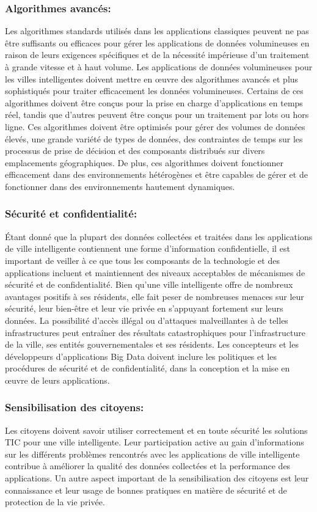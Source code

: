 \documentclass[french, a4paper, 12pt]{report}
\begin{document}
\subsubsection{Algorithmes avancés:}
Les algorithmes standards utilisés dans les applications classiques peuvent ne pas être suffisants ou efficaces pour gérer les applications de données volumineuses en raison de leurs exigences spécifiques et de la nécessité impérieuse d'un traitement à grande vitesse et à haut volume. Les applications de données volumineuses pour les villes intelligentes doivent mettre en œuvre des algorithmes avancés et plus sophistiqués pour traiter efficacement les données volumineuses. Certains de ces algorithmes doivent être conçus pour la prise en charge d'applications en temps réel, tandis que d'autres peuvent être conçus pour un traitement par lots ou hors ligne. Ces algorithmes doivent être optimisés pour gérer des volumes de données élevés, une grande variété de types de données, des contraintes de temps sur les processus de prise de décision et des composants distribués sur divers emplacements géographiques. De plus, ces algorithmes doivent fonctionner efficacement dans des environnements hétérogènes et être capables de gérer et de fonctionner dans des environnements hautement dynamiques.\\
\subsubsection{Sécurité et confidentialité:}
Étant donné que la plupart des données collectées et traitées dans les applications de ville intelligente contiennent une forme d’information confidentielle, il est important de veiller à ce que tous les composants de la technologie et des applications incluent et maintiennent des niveaux acceptables de mécanismes de sécurité et de confidentialité. Bien qu'une ville intelligente offre de nombreux avantages positifs à ses résidents, elle fait peser de nombreuses menaces sur leur sécurité, leur bien-être et leur vie privée en s'appuyant fortement sur leurs données. La possibilité d'accès illégal ou d'attaques malveillantes à de telles infrastructures peut entraîner des résultats catastrophiques pour l'infrastructure de la ville, ses entités gouvernementales et ses résidents. Les concepteurs et les développeurs d’applications Big Data doivent inclure les politiques et les procédures de sécurité et de confidentialité, dans la conception et la mise en œuvre de leurs applications. \\
\subsubsection{Sensibilisation des citoyens:}
Les citoyens doivent savoir utiliser correctement et en toute sécurité les solutions TIC pour une ville intelligente. Leur participation active au gain d'informations sur les différents problèmes rencontrés avec les applications de ville intelligente contribue à améliorer la qualité des données collectées et la performance des applications. Un autre aspect important de la sensibilisation des citoyens est leur connaissance et leur usage de bonnes pratiques en matière de sécurité et de protection de la vie privée. \\
\end{document}
